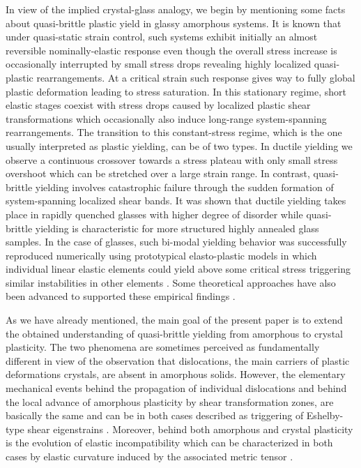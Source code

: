 \documentclass[aps,
superscriptaddress,notitlepage]{revtex4-1}
\begin{document}
In view of the implied crystal-glass analogy, we begin by mentioning  some facts about quasi-brittle plastic yield  in glassy amorphous systems.  It is known that  under quasi-static  strain control, such systems exhibit  initially an almost reversible nominally-elastic  response even though  the overall stress increase  is   occasionally interrupted  by small stress drops revealing highly localized quasi-plastic rearrangements.   At a  critical  strain  such  response  gives way to fully global  plastic deformation  leading to stress  saturation.  In this stationary regime, short elastic stages coexist with  stress drops caused by localized  plastic shear transformations which occasionally  also induce long-range system-spanning rearrangements.  The transition to this constant-stress regime, which  is the one usually  interpreted as plastic yielding, can be of two types.  In ductile yielding we observe  a continuous crossover towards a stress plateau with only small stress overshoot which can be stretched over a large strain range.  In contrast, quasi-brittle yielding involves catastrophic failure through the sudden formation of system-spanning localized shear bands.   It was shown  that ductile  yielding takes place in  rapidly quenched glasses with  higher  degree of disorder while quasi-brittle yielding  is characteristic for more structured  highly annealed glass samples.  In the case of glasses,  such bi-modal yielding behavior  was successfully  reproduced numerically  using  prototypical elasto-plastic models in which  individual  linear elastic elements  could yield above some critical stress   triggering similar instabilities in other elements \cite{Nicolas2018-iy,Rodney2011-ld,popovic2018elastoplastic,Tanguy2021-ap,TALAMALI2012275}. 
Some theoretical approaches have also been advanced to supported these empirical findings \cite{Parley2024-jb,karmakar2010statistical,ozawa2018random,Divoux2024-ks}. 


  
As we have already mentioned, the main goal of the present  paper is to  extend the obtained  understanding of quasi-brittle yielding from amorphous  to crystal plasticity.  The two phenomena are sometimes perceived as fundamentally different in view of the observation that dislocations, the main carriers of plastic deformations  crystals, are absent in amorphous solids. However, the elementary mechanical events  behind the propagation  of individual dislocations  and behind the local advance of amorphous plasticity by  shear transformation zones, are basically the same and can be in both cases described  as  triggering of Eshelby-type shear eigenstrains \cite{Picard2004,Budrikis2017-ex,Cai2006-fe}.
Moreover, behind both amorphous and crystal plasticity is the evolution of elastic incompatibility which can be  characterized in both cases by elastic curvature induced by the associated metric tensor \cite{Moshe2015-rm,Baggioli2022-nx,Bowick2009-bl,Katanaev1992-kl,Sozio2020-tg}. 
\end{document}
